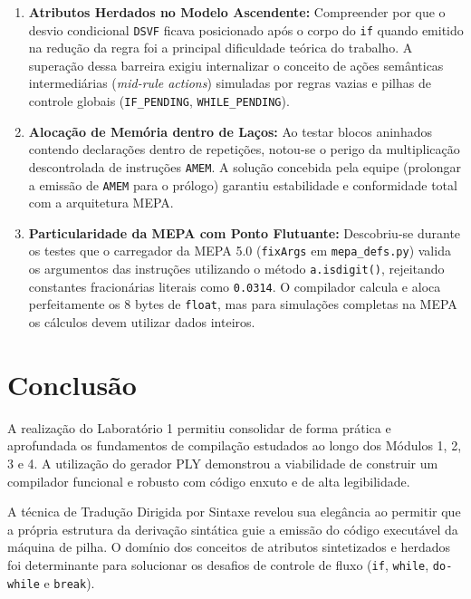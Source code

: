 \documentclass[12pt,a4paper]{article}
\begin{document}
\begin{enumerate}
    \item \textbf{Atributos Herdados no Modelo Ascendente:} Compreender por que o desvio
          condicional \texttt{DSVF} ficava posicionado após o corpo do \texttt{if} quando
          emitido na redução da regra foi a principal dificuldade teórica do trabalho.
          A superação dessa barreira exigiu internalizar o conceito de ações semânticas
          intermediárias (\textit{mid-rule actions}) simuladas por regras vazias e
          pilhas de controle globais (\texttt{IF\_PENDING}, \texttt{WHILE\_PENDING}).
    \item \textbf{Alocação de Memória dentro de Laços:} Ao testar blocos aninhados contendo
          declarações dentro de repetições, notou-se o perigo da multiplicação descontrolada
          de instruções \texttt{AMEM}. A solução concebida pela equipe (prolongar a emissão
          de \texttt{AMEM} para o prólogo) garantiu estabilidade e conformidade total
          com a arquitetura MEPA.
    \item \textbf{Particularidade da MEPA com Ponto Flutuante:} Descobriu-se durante os
          testes que o carregador da MEPA 5.0 (\texttt{fixArgs} em \texttt{mepa\_defs.py})
          valida os argumentos das instruções utilizando o método \texttt{a.isdigit()},
          rejeitando constantes fracionárias literais como \texttt{0.0314}. O compilador
          calcula e aloca perfeitamente os 8 bytes de \texttt{float}, mas para simulações
          completas na MEPA os cálculos devem utilizar dados inteiros.
\end{enumerate}

\section{Conclusão}

A realização do Laboratório 1 permitiu consolidar de forma prática e aprofundada os
fundamentos de compilação estudados ao longo dos Módulos 1, 2, 3 e 4. A utilização
do gerador PLY demonstrou a viabilidade de construir um compilador funcional e
robusto com código enxuto e de alta legibilidade.

A técnica de Tradução Dirigida por Sintaxe revelou sua elegância ao permitir que a
própria estrutura da derivação sintática guie a emissão do código executável da
máquina de pilha. O domínio dos conceitos de atributos sintetizados e herdados foi
determinante para solucionar os desafios de controle de fluxo (\texttt{if}, \texttt{while},
\texttt{do-while} e \texttt{break}).
\end{document}

